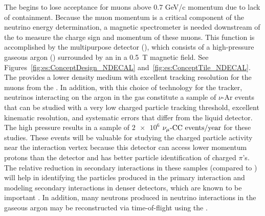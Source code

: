 The  begins to lose acceptance for muons above 0.7 GeV/c momentum due to lack of containment.  Because the muon momentum is a critical component of the neutrino energy determination, a magnetic spectrometer is needed downstream of the  to measure the charge sign and momentum of these muons.  This function is accomplished by the multipurpose detector (), which consists of a high-pressure gaseous argon  () surrounded by an  in a \SI{0.5}{T} magnetic field. See Figures~\ref{fig:es:ConceptDesign_NDECAL} and~\ref{fig:es:ConceptTile_NDECAL}. 
The  provides a lower density medium with excellent tracking resolution for the muons from the .  In addition, with this choice of technology for the tracker, neutrinos interacting on the argon in the gas  constitute a sample of $\nu$-Ar events that can be studied with a very low charged particle tracking threshold, excellent kinematic resolution, and systematic errors that differ from the liquid detector. The high pressure results in a sample of $\num{2e6}$ ${\nu_\mu \text{-CC events/year}}$ for these studies. These events will be valuable for studying the charged particle activity near the interaction vertex because this detector can access lower momentum protons than the  detector and has better particle identification of charged $\pi$'s.  The relative reduction in secondary interactions in these samples (compared to ) will help in identifying the particles produced in the primary interaction and modeling secondary interactions in denser detectors, which are known to be important \cite{Friedland:2018vry}.
In addition, many neutrons produced in neutrino interactions in the gaseous argon may be reconstructed via time-of-flight using the .    
  

